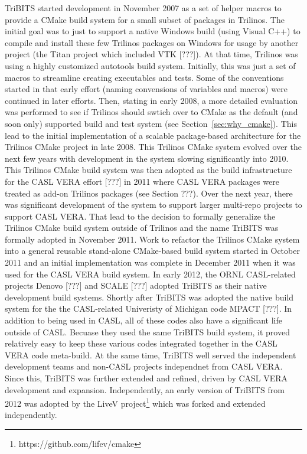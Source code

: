 \documentclass[note]{TechNote}
\begin{document}
TriBITS started development in November 2007 as a set of helper macros to provide a CMake build system for a small subset of packages in Trilinos.  The initial goal was to just to support a native Windows build (using Visual C++) to compile and install these few Trilinos packages on Windows for usage by another project (the Titan project which included VTK [???]).  At that time, Trilinos was using a highly customized autotools build system.  Initially, this was just a set of macros to streamline creating executables and tests.  Some of the conventions started in that early effort (naming convensions of variables and macros) were continued in later efforts.  Then, stating in early 2008, a more detailed evaluation was performed to see if Trilinos should swtich over to CMake as the default (and soon only) supported build and test system (see Section~\ref{sec:why_cmake}).  This lead to the initial implementation of a scalable package-based architecture for the Trilinos CMake project in late 2008.  This Trilinos CMake system evolved over the next few years with development in the system slowing significantly into 2010.  This Trilinos CMake build system was then adopted as the build infrastructure for the CASL VERA effort [???] in 2011 where CASL VERA packages were treated as add-on Trilinos packages (see Section ???).  Over the next year, there was significant development of the system to support larger multi-repo projects to support CASL VERA.  That lead to the decision to formally generalize the Trilinos CMake build system outside of Trilinos and the name TriBITS was formally adopted in November 2011.  Work to refactor the Trilinos CMake system into a general reusable stand-alone CMake-based build system started in October 2011 and an initial implementation was complete in December 2011 when it was used for the CASL VERA build system.  In early 2012, the ORNL CASL-related projects Denovo [???] and SCALE [???] adopted TriBITS as their native development build systems.  Shortly after TriBITS was adopted the native build system for the the CASL-related Univeristy of Michigan code MPACT [???].  In addition to being used in CASL, all of these codes also have a significant life outside of CASL.  Becuase they used the same TriBITS build system, it proved relatively easy to keep these various codes integrated together in the CASL VERA code meta-build.  At the same time, TriBITS well served the independent development teams and non-CASL projects independnet from CASL VERA.  Since this, TriBITS was further extended and refined, driven by CASL VERA development and expansion.  Independently, an early version of TriBITS from 2012 was adopted by the LiveV project\footnote{https://github.com/lifev/cmake} which was forked and extended independently.
\end{document}
